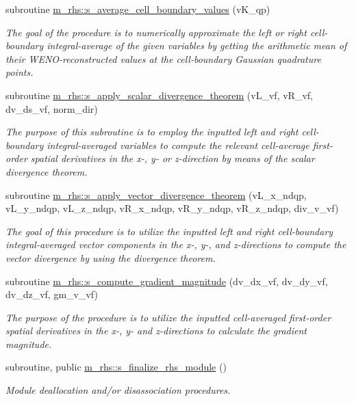 \begin{DoxyCompactItemize}
subroutine \hyperlink{namespacem__rhs_ada159015fa6f204a01a0c1b254affdae}{m\+\_\+rhs\+::s\+\_\+average\+\_\+cell\+\_\+boundary\+\_\+values} (v\+K\+\_\+qp)
\begin{DoxyCompactList}\small\item\em The goal of the procedure is to numerically approximate the left or right cell-\/boundary integral-\/average of the given variables by getting the arithmetic mean of their W\+E\+N\+O-\/reconstructed values at the cell-\/boundary Gaussian quadrature points. \end{DoxyCompactList}\item 
subroutine \hyperlink{namespacem__rhs_ac7d49938e97f8843c84f335ff0f6cceb}{m\+\_\+rhs\+::s\+\_\+apply\+\_\+scalar\+\_\+divergence\+\_\+theorem} (v\+L\+\_\+vf, v\+R\+\_\+vf, dv\+\_\+ds\+\_\+vf, norm\+\_\+dir)
\begin{DoxyCompactList}\small\item\em The purpose of this subroutine is to employ the inputted left and right cell-\/boundary integral-\/averaged variables to compute the relevant cell-\/average first-\/order spatial derivatives in the x-\/, y-\/ or z-\/direction by means of the scalar divergence theorem. \end{DoxyCompactList}\item 
subroutine \hyperlink{namespacem__rhs_ad6141c10a72d8ff3a9fb5f16b89bdcc3}{m\+\_\+rhs\+::s\+\_\+apply\+\_\+vector\+\_\+divergence\+\_\+theorem} (v\+L\+\_\+x\+\_\+ndqp, v\+L\+\_\+y\+\_\+ndqp, v\+L\+\_\+z\+\_\+ndqp, v\+R\+\_\+x\+\_\+ndqp, v\+R\+\_\+y\+\_\+ndqp, v\+R\+\_\+z\+\_\+ndqp, div\+\_\+v\+\_\+vf)
\begin{DoxyCompactList}\small\item\em The goal of this procedure is to utilize the inputted left and right cell-\/boundary integral-\/averaged vector components in the x-\/, y-\/, and z-\/directions to compute the vector divergence by using the divergence theorem. \end{DoxyCompactList}\item 
subroutine \hyperlink{namespacem__rhs_ab733571c02acf3c3d16b0bfbed34b79e}{m\+\_\+rhs\+::s\+\_\+compute\+\_\+gradient\+\_\+magnitude} (dv\+\_\+dx\+\_\+vf, dv\+\_\+dy\+\_\+vf, dv\+\_\+dz\+\_\+vf, gm\+\_\+v\+\_\+vf)
\begin{DoxyCompactList}\small\item\em The purpose of the procedure is to utilize the inputted cell-\/averaged first-\/order spatial derivatives in the x-\/, y-\/ and z-\/directions to calculate the gradient magnitude. \end{DoxyCompactList}\item 
subroutine, public \hyperlink{namespacem__rhs_a73fc1430500bdd1786b121a9ed08a107}{m\+\_\+rhs\+::s\+\_\+finalize\+\_\+rhs\+\_\+module} ()
\begin{DoxyCompactList}\small\item\em Module deallocation and/or disassociation procedures. \end{DoxyCompactList}\end{DoxyCompactItemize}


